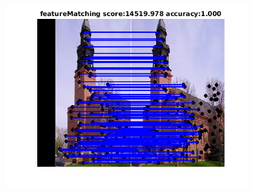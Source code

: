 \documentclass[
	fontsize=12pt,
	paper=a4,
	twoside=false,
	numbers=noenddot,
	plainheadsepline,
	toc=listof,
	toc=bibliography
]{scrartcl}
\begin{document}
\begin{figure}[h]
\begin{subfigure}[b]{0.3\textwidth}
		\includegraphics[scale=0.4]{"fig_ver2608/RealImages/Img_trafo/no_descr/using_cdf_afftrafo/fi_3_featM"} 
	\end{subfigure} 	


\end{figure}
\end{document}
